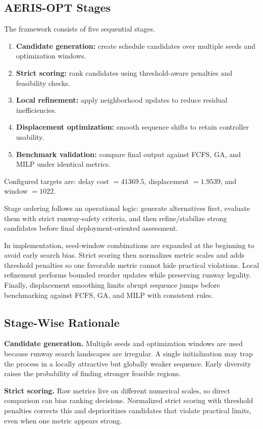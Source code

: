 \documentclass[conference]{IEEEtran}
\begin{document}
\subsection{AERIS-OPT Stages}
The framework consists of five sequential stages.
\begin{enumerate}
    \item \textbf{Candidate generation:} create schedule candidates over multiple seeds and optimization windows.
    \item \textbf{Strict scoring:} rank candidates using threshold-aware penalties and feasibility checks.
    \item \textbf{Local refinement:} apply neighborhood updates to reduce residual inefficiencies.
    \item \textbf{Displacement optimization:} smooth sequence shifts to retain controller usability.
    \item \textbf{Benchmark validation:} compare final output against FCFS, GA, and MILP under identical metrics.
\end{enumerate}

Configured targets are: delay cost $=41369.5$, displacement $=1.9539$, and window $=1022$.

Stage ordering follows an operational logic: generate alternatives first, evaluate them with strict runway-safety criteria, and then refine/stabilize strong candidates before final deployment-oriented assessment.

In implementation, seed-window combinations are expanded at the beginning to avoid early search bias. Strict scoring then normalizes metric scales and adds threshold penalties so one favorable metric cannot hide practical violations. Local refinement performs bounded reorder updates while preserving runway legality. Finally, displacement smoothing limits abrupt sequence jumps before benchmarking against FCFS, GA, and MILP with consistent rules.

\subsection{Stage-Wise Rationale}
\textbf{Candidate generation.} Multiple seeds and optimization windows are used because runway search landscapes are irregular. A single initialization may trap the process in a locally attractive but globally weaker sequence. Early diversity raises the probability of finding stronger feasible regions.

\textbf{Strict scoring.} Raw metrics live on different numerical scales, so direct comparison can bias ranking decisions. Normalized strict scoring with threshold penalties corrects this and deprioritizes candidates that violate practical limits, even when one metric appears strong.
\end{document}
